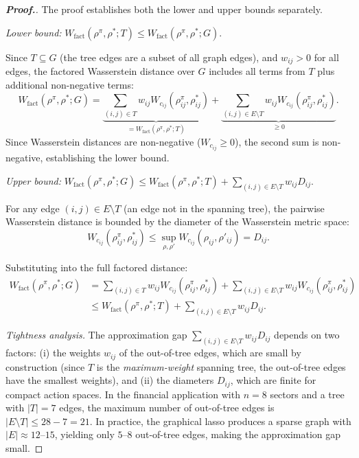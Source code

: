 \documentclass[12pt,a4paper,oneside]{report}
\theoremstyle{definition}
\theoremstyle{remark}
\begin{document}
\begin{proof}[\textbf{Proof.}]
The proof establishes both the lower and upper bounds separately.

\medskip
\noindent\textit{Lower bound:} $W_{\text{fact}}(\rho^\pi, \rho^*; T) \leq W_{\text{fact}}(\rho^\pi, \rho^*; G)$.

Since $T \subseteq G$ (the tree edges are a subset of all graph edges), and $w_{ij} > 0$ for all edges, the factored Wasserstein distance over $G$ includes all terms from $T$ plus additional non-negative terms:
\[
W_{\text{fact}}(\rho^\pi, \rho^*; G) = \underbrace{\sum_{(i,j) \in T} w_{ij} W_{c_{ij}}(\rho^\pi_{ij}, \rho^*_{ij})}_{= W_{\text{fact}}(\rho^\pi, \rho^*; T)} + \underbrace{\sum_{(i,j) \in E \setminus T} w_{ij} W_{c_{ij}}(\rho^\pi_{ij}, \rho^*_{ij})}_{\geq 0}.
\]
Since Wasserstein distances are non-negative ($W_{c_{ij}} \geq 0$), the second sum is non-negative, establishing the lower bound.

\medskip
\noindent\textit{Upper bound:} $W_{\text{fact}}(\rho^\pi, \rho^*; G) \leq W_{\text{fact}}(\rho^\pi, \rho^*; T) + \sum_{(i,j) \in E \setminus T} w_{ij} D_{ij}$.

For any edge $(i,j) \in E \setminus T$ (an edge not in the spanning tree), the pairwise Wasserstein distance is bounded by the diameter of the Wasserstein metric space:
\[
W_{c_{ij}}(\rho^\pi_{ij}, \rho^*_{ij}) \leq \sup_{\rho, \rho'} W_{c_{ij}}(\rho_{ij}, \rho'_{ij}) = D_{ij}.
\]

Substituting into the full factored distance:
\begin{align*}
W_{\text{fact}}(\rho^\pi, \rho^*; G) &= \sum_{(i,j) \in T} w_{ij} W_{c_{ij}}(\rho^\pi_{ij}, \rho^*_{ij}) + \sum_{(i,j) \in E \setminus T} w_{ij} W_{c_{ij}}(\rho^\pi_{ij}, \rho^*_{ij}) \\
&\leq W_{\text{fact}}(\rho^\pi, \rho^*; T) + \sum_{(i,j) \in E \setminus T} w_{ij} D_{ij}. \qquad
\end{align*}

\medskip
\noindent\textit{Tightness analysis.}
The approximation gap $\sum_{(i,j) \in E \setminus T} w_{ij} D_{ij}$ depends on two factors: (i) the weights $w_{ij}$ of the out-of-tree edges, which are small by construction (since $T$ is the \emph{maximum-weight} spanning tree, the out-of-tree edges have the smallest weights), and (ii) the diameters $D_{ij}$, which are finite for compact action spaces. In the financial application with $n = 8$ sectors and a tree with $|T| = 7$ edges, the maximum number of out-of-tree edges is $|E \setminus T| \leq 28 - 7 = 21$. In practice, the graphical lasso produces a sparse graph with $|E| \approx 12$--$15$, yielding only $5$--$8$ out-of-tree edges, making the approximation gap small.
\end{proof}
\end{document}
